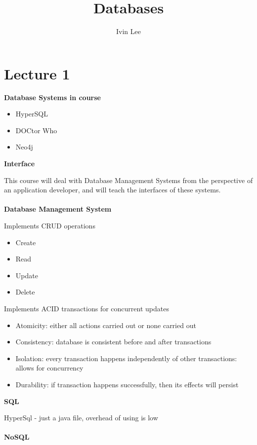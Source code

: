\documentclass[12pt,a4paper]{article} %
\author{Ivin Lee}
\title{Databases}
\begin{document}
\maketitle
\section{Lecture 1}
\textbf{Database Systems in course}
	\begin{itemize}
	\item HyperSQL
	\item DOCtor Who
	\item Neo4j
	\end{itemize}
\textbf{Interface}

This course will deal with Database Management Systems from the perspective of an application developer, and will teach the interfaces of these systems.
\\\\
\textbf{Database Management System}

Implements CRUD operations
	\begin{itemize}
	\item Create
	\item Read
	\item Update
	\item Delete
	\end{itemize}
Implements ACID transactions for concurrent updates
	\begin{itemize}
	\item Atomicity: either all actions carried out or none carried out
	\item Consistency: database is consistent before and after transactions
	\item Isolation: every transaction happens independently of other transactions: allows for concurrency
	\item Durability: if transaction happens successfully, then its effects will persist
	\end{itemize}
\textbf{SQL}

HyperSql - just a java file, overhead of using is low
\\\\
\textbf{NoSQL}
\end{document}
